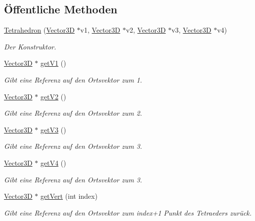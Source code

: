 \subsection*{Öffentliche Methoden}
\begin{DoxyCompactItemize}
\item 
\hyperlink{classTetrahedron_a84e19dba5735a455269abca8229b4bb4}{Tetrahedron} (\hyperlink{classVector3D}{Vector3\-D} $\ast$v1, \hyperlink{classVector3D}{Vector3\-D} $\ast$v2, \hyperlink{classVector3D}{Vector3\-D} $\ast$v3, \hyperlink{classVector3D}{Vector3\-D} $\ast$v4)
\begin{DoxyCompactList}\small\item\em Der Konstruktor. \end{DoxyCompactList}\item 
\hyperlink{classVector3D}{Vector3\-D} $\ast$ \hyperlink{classTetrahedron_add51e42ab17afbd023d47a436ce24b0d}{get\-V1} ()
\begin{DoxyCompactList}\small\item\em Gibt eine Referenz auf den Ortsvektor zum 1. \end{DoxyCompactList}\item 
\hyperlink{classVector3D}{Vector3\-D} $\ast$ \hyperlink{classTetrahedron_aa728c967f17e2b8408009b5f2b77a17a}{get\-V2} ()
\begin{DoxyCompactList}\small\item\em Gibt eine Referenz auf den Ortsvektor zum 2. \end{DoxyCompactList}\item 
\hyperlink{classVector3D}{Vector3\-D} $\ast$ \hyperlink{classTetrahedron_aa539a97f133ea621520121acb2ef4a7e}{get\-V3} ()
\begin{DoxyCompactList}\small\item\em Gibt eine Referenz auf den Ortsvektor zum 3. \end{DoxyCompactList}\item 
\hyperlink{classVector3D}{Vector3\-D} $\ast$ \hyperlink{classTetrahedron_a7308b7b73edeba7782dff551a03095bf}{get\-V4} ()
\begin{DoxyCompactList}\small\item\em Gibt eine Referenz auf den Ortsvektor zum 3. \end{DoxyCompactList}\item 
\hyperlink{classVector3D}{Vector3\-D} $\ast$ \hyperlink{classTetrahedron_a88afe41ae5991168ad51ba4dbb2e1a6b}{get\-Vert} (int index)
\begin{DoxyCompactList}\small\item\em Gibt eine Referenz auf den Ortsvektor zum index+1 Punkt des Tetraeders zurück. \end{DoxyCompactList}\end{DoxyCompactItemize}
